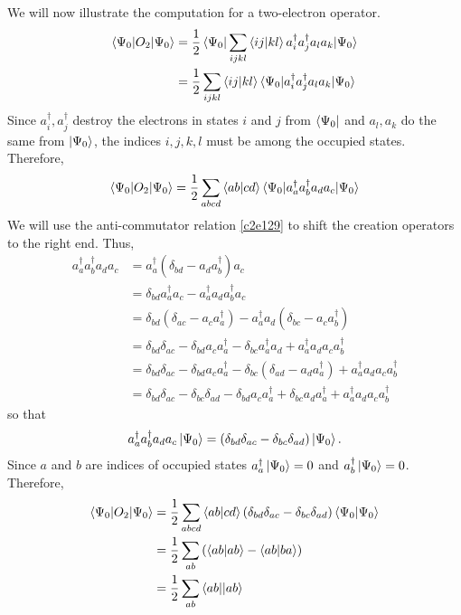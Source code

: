 We will now illustrate the computation for a two-electron operator.
\[
\begin{aligned}
\braket{\Psi_0|O_2|\Psi_0} &= 
\frac{1}{2}\braket{\Psi_0|\sum_{ijkl}\braket{ij|kl}a_i^\dagger a_j^\dagger 
a_la_k|\Psi_0} \\
&=
\frac{1}{2}\sum_{ijkl}\braket{ij|kl}\braket{\Psi_0|a_i^\dagger a_j^\dagger 
a_la_k|\Psi_0} 
 \end{aligned}
\]
Since $a_i^\dagger, a_j^\dagger$ destroy the electrons in states $i$ and $j$ 
from $\bra{\Psi_0}$ and $a_l, a_k$ do the same from $\ket{\Psi_0}$, the indices
$i, j, k, l$ must be among the occupied states. Therefore,
\[
\braket{\Psi_0|O_2|\Psi_0} = \frac{1}{2}
\sum_{abcd}\braket{ab|cd}\braket{\Psi_0|a_a^\dagger a_b^\dagger a_da_c|\Psi_0} 
\]
We will use the anti-commutator relation \eqref{c2e129} to shift the creation
operators to the right end. Thus,
\[
\begin{aligned}
a_a^\dagger a_b^\dagger a_da_c &= a_a^\dagger(\delta_{bd} - a_da_b^\dagger)a_c \\
 &= \delta_{bd}a_a^\dagger a_c - a_a^\dagger a_d a_b^\dagger a_c \\
 &= \delta_{bd}(\delta_{ac} - a_ca_a^\dagger) - a_a^\dagger a_d(\delta_{bc} - 
 a_c a_b^\dagger) \\
 &= \delta_{bd}\delta_{ac} - \delta_{bd} a_ca_a^\dagger - \delta_{bc}a_a^\dagger
    a_d + a_a^\dagger a_d a_ca_b^\dagger \\
 &= \delta_{bd}\delta_{ac} - \delta_{bd} a_ca_a^\dagger - \delta_{bc}(\delta_{ad}
  - a_d a_a^\dagger)  + a_a^\dagger a_d a_ca_b^\dagger \\
 &= \delta_{bd}\delta_{ac} - \delta_{bc}\delta_{ad} - \delta_{bd} a_ca_a^\dagger
 + \delta_{bc}a_da_a^\dagger + a_a^\dagger a_d a_ca_b^\dagger 
\end{aligned}
\]
so that
\[
a_a^\dagger a_b^\dagger a_da_c\ket{\Psi_0} = (\delta_{bd}\delta_{ac} - 
\delta_{bc}\delta_{ad})\ket{\Psi_0}.
\]
Since $a$ and $b$ are indices of occupied states $a_a^\dagger\ket{\Psi_0} = 0$
and $a_b^\dagger\ket{\Psi_0} = 0$. Therefore,
\begin{equation}\label{c2e136}
\begin{aligned}
\braket{\Psi_0|O_2|\Psi_0} &= \frac{1}{2}\sum_{abcd}\braket{ab|cd}(
 \delta_{bd}\delta_{ac} - \delta_{bc}\delta_{ad})\braket{\Psi_0|\Psi_0} \\
 &= \frac{1}{2}\sum_{ab}\left(\braket{ab|ab} - \braket{ab|ba}\right) \\
 &= \frac{1}{2}\sum_{ab}\braket{ab||ab}
\end{aligned}
\end{equation}

